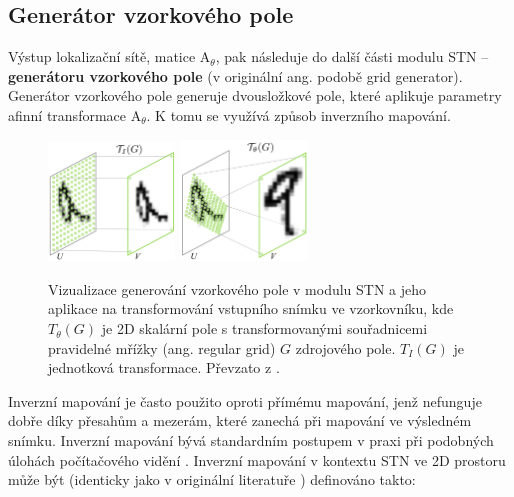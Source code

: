 \subsection{Generátor vzorkového pole}

Výstup lokalizační sítě, matice ${\displaystyle \mathrm {A} }_\theta$, pak následuje do další části modulu STN -- \textbf{generátoru vzorkového pole} (v originální ang. podobě grid generator). Generátor vzorkového pole generuje dvousložkové pole, které aplikuje parametry afinní transformace ${\displaystyle \mathrm {A} }_\theta$. K tomu se využívá způsob inverzního mapování.

\begin{figure}[h]
\centering
\includegraphics[width=0.3\textwidth,keepaspectratio]{Figures/stn/stn_a.png}
\includegraphics[width=0.3\textwidth,keepaspectratio]{Figures/stn/stn_b.png}
\caption[Vizualizace generování vzorkového pole v modulu STN]
{Vizualizace generování vzorkového pole v modulu STN a jeho aplikace na transformování vstupního snímku ve vzorkovníku, kde $T_{\theta}(G)$ je 2D skalární pole s transformovanými souřadnicemi pravidelné mřížky (ang. regular grid) $G$ zdrojového pole. $T_{I}(G)$ je jednotková transformace. Převzato z \cite{stn}. }
\label{fig:stn_grid}
\end{figure}

Inverzní mapování je často použito oproti přímému mapování, jenž nefunguje dobře díky přesahům a mezerám, které zanechá při mapování ve výsledném snímku. Inverzní mapování bývá standardním postupem v praxi při podobných úlohách počítačového vidění \cite{stn_medium_1}. Inverzní mapování v kontextu STN ve 2D prostoru může být (identicky jako v originální literatuře \cite{stn}) definováno takto:

